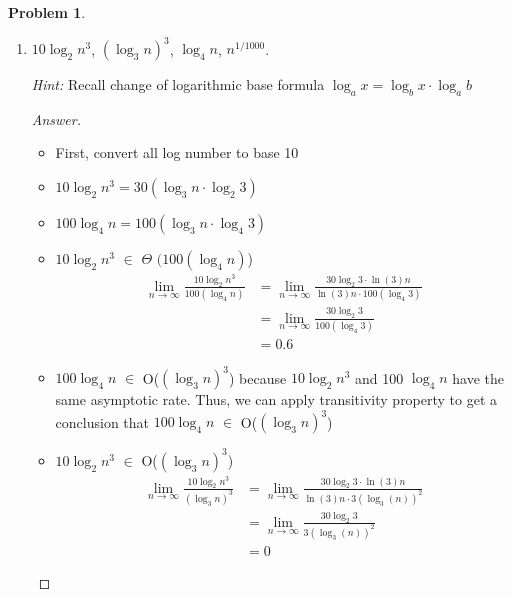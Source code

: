 \documentclass[11pt]{article}
\theoremstyle{definition}
\theoremstyle{definition}
\newtheorem{required}{Problem}
\theoremstyle{definition}
\begin{document}
\begin{required}
\begin{enumerate} [label=(\alph*)]
\begin{proof}[Answer]
\begin{itemize}
\item These functions grow at the same asymptotic rate: $ n^3-10$ and $ n^3+20n^2+1000$, but slower than $10n^3\sqrt{n}$
\item $10n^3\sqrt{n}$ is slower than $n^4-50n^3$
\item This function grows the fastest: $n^4-50n^3$
\end{itemize}
    \end{proof}
    
    
    
        
    \newpage
\subsection{Problem 2\ref{1b}}
    \item \label{1b} $10 \log_2 n^3$, \qquad $(\log_3 n)^3 $,  $\log_4 n$,  \qquad $n^{1/1000}$.
    
    \emph{Hint:} Recall change of logarithmic base formula $\log_a x = \log_b x\cdot\log_a b$
    \begin{proof}[Answer]
\begin{itemize}
\item First, convert all log number to base 10
\item $10 \log_2 n^3 = 30(\log_3 n \cdot \log_2 3)$
\item $100 \log_4 n = 100(\log_3 n \cdot \log_4 3)$



\item $10 \log_2 n^3$ $\in$ $\Theta$ $(100(\log_4 n) $)\\
\begin{align*}
\lim_{n \to \infty} \frac{10 \log_2 n^3}{100(\log_4 n)} &= \lim_{n \to \infty} \frac{30\log_2 3 \cdot \ln{(3)}n}{\ln{(3)}n \cdot 100(\log_4 3)} \\
&= \lim_{n \to \infty} \frac{30\log_2 3}{100(\log_4 3)} \\
&= 0.6
\end{align*}

\item $100\log_4 n $ $\in$ O($(\log_3 n)^3 $) because $10 \log_2 n^3$ and 100 $\log_4 n$ have the same asymptotic rate. Thus, we can apply transitivity property to get a conclusion that $100\log_4 n $ $\in$ O($(\log_3 n)^3 $)

\item $10 \log_2 n^3$ $\in$ O($(\log_3 n)^3 $)\\
\begin{align*}
\lim_{n \to \infty} \frac{10 \log_2 n^3}{(\log_3 n)^3} &= \lim_{n \to \infty} \frac{30\log_2 3 \cdot \ln{(3)}n}{\ln{(3)}n \cdot 3(\log_3 (n))^2} \\
&= \lim_{n \to \infty} \frac{30\log_2 3}{3(\log_3 (n))^2} \\
&= 0
\end{align*}



\end{itemize}
\end{proof}
\end{enumerate}
\end{required}
\end{document}
